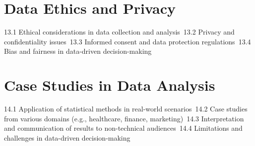 \section{Data Ethics and Privacy}
13.1 Ethical considerations in data collection and analysis\
13.2 Privacy and confidentiality issues\
13.3 Informed consent and data protection regulations\
13.4 Bias and fairness in data-driven decision-making\
\section{Case Studies in Data Analysis}
14.1 Application of statistical methods in real-world scenarios\
14.2 Case studies from various domains (e.g., healthcare, finance, marketing)\
14.3 Interpretation and communication of results to non-technical audiences\
14.4 Limitations and challenges in data-driven decision-making\
